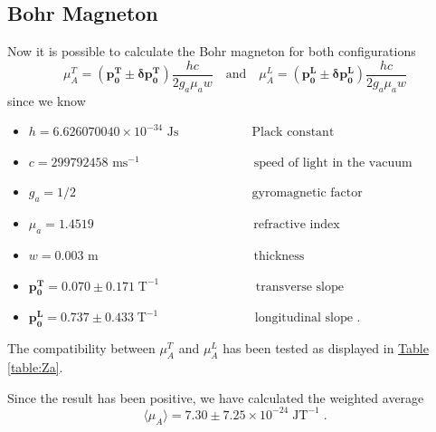 \documentclass[a4paper,12pt,abstracton]{scrartcl}
\begin{document}
\subsection{Bohr Magneton}
Now it is possible to calculate the Bohr magneton for both configurations $$\mu_A^T= (\boldsymbol{p_0^T}\pm \boldsymbol{\delta p_0^T})\frac{hc}{2g_a\mu_a w} \quad\text{and}\quad \mu_A^L= (\boldsymbol{p_0^L}\pm \boldsymbol{\delta p_0^L})\frac{hc}{2g_a\mu_a w}$$ 
 since we know 
\begin{itemize}
\item $h=6.626070040\times10^{-34} \text{ Js}  \;\,\quad\qquad\qquad\text{ Plack constant}$  
\item $c=299792458 \text{ ms}^{-1}  \quad\qquad\qquad\qquad\qquad\text{speed of light in the vacuum}$
\item $g_a=1/2   \;\;\quad\qquad\qquad\qquad\qquad\qquad\qquad\text{ gyromagnetic factor}$
\item $\mu_a= 1.4519    \;\qquad\qquad\qquad\qquad\qquad\qquad\text{ refractive index}$
\item  $w= 0.003 \text{ m} \;\qquad\qquad\qquad\qquad\qquad\qquad\text{thickness}$
\item $\boldsymbol{p_0^{T}}=0.070 \pm 0.171 \;\text{T}^{-1}
\;\quad\qquad\qquad\qquad\text{ transverse slope}$
\item $\boldsymbol{p_0^{L}}=0.737 \pm 0.433 \;\text{T}^{-1} \;\quad\qquad\qquad\qquad\text{ longitudinal slope .}$\newline
\end{itemize} 

The compatibility between $\mu_A^T$ and $\mu_A^L$ has been tested as displayed in \hyperref[table:Za]{Table \ref*{table:Za}}. 
\begin{table}[H]
\caption{}
\centering
{}
\label{table:Za}
\end{table}

Since the result has been positive, we have calculated the weighted average $$ \langle \mu_A\rangle=7.30 \pm 7.25\times 10^{-24}\;\text{JT}^{-1}\;.$$

\end{document}
